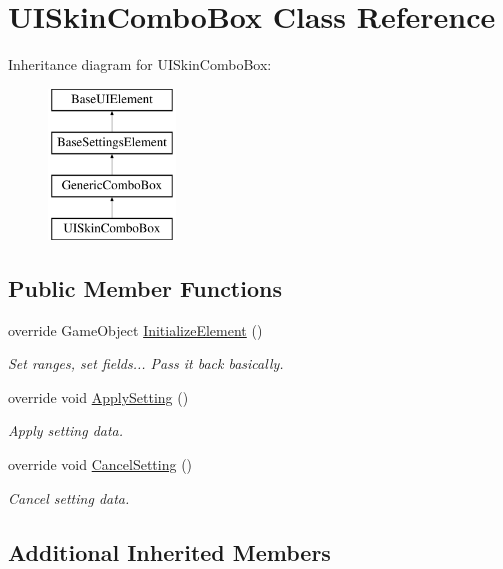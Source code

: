 \hypertarget{class_u_i_skin_combo_box}{}\section{U\+I\+Skin\+Combo\+Box Class Reference}
\label{class_u_i_skin_combo_box}
Inheritance diagram for U\+I\+Skin\+Combo\+Box\+:\begin{figure}[H]
\begin{center}
\leavevmode
\includegraphics[height=4.000000cm]{class_u_i_skin_combo_box}
\end{center}
\end{figure}
\subsection*{Public Member Functions}
\begin{DoxyCompactItemize}
\item 
override Game\+Object \hyperlink{class_u_i_skin_combo_box_a4d7b16b8368b3cc075fa026a6e60af88}{Initialize\+Element} ()
\begin{DoxyCompactList}\small\item\em Set ranges, set fields... Pass it back basically. \end{DoxyCompactList}\item 
override void \hyperlink{class_u_i_skin_combo_box_a6995ec911a8cacc899e3c44aa3099fff}{Apply\+Setting} ()
\begin{DoxyCompactList}\small\item\em Apply setting data. \end{DoxyCompactList}\item 
override void \hyperlink{class_u_i_skin_combo_box_adf108006beddfd416f81ec09ecd025f9}{Cancel\+Setting} ()
\begin{DoxyCompactList}\small\item\em Cancel setting data. \end{DoxyCompactList}\end{DoxyCompactItemize}
\subsection*{Additional Inherited Members}



